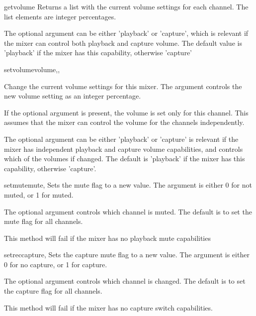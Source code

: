 \begin{methoddesc}[Mixer]{getvolume}{}
  Returns a list with the current volume settings for each channel.
  The list elements are integer percentages.

  The optional  argument can be either 'playback' or
  'capture', which is relevant if the mixer can control both playback
  and capture volume. The default value is 'playback' if the mixer has
  this capability, otherwise 'capture'

\end{methoddesc}

\begin{methoddesc}[Mixer]{setvolume}{volume,,
    }

  Change the current volume settings for this mixer. The 
  argument controls the new volume setting as an integer percentage.

  If the optional argument  is present, the volume is set
  only for this channel. This assumes that the mixer can control the
  volume for the channels independently.

  The optional  argument can be either 'playback' or
  'capture' is relevant if the mixer has independent playback and
  capture volume capabilities, and controls which of the volumes if
  changed. The default is 'playback' if the mixer has this capability,
  otherwise 'capture'.
\end{methoddesc}

\begin{methoddesc}[Mixer]{setmute}{mute, }
  Sets the mute flag to a new value. The  argument is either
  0 for not muted, or 1 for muted.

  The optional  argument controls which channel is muted.
  The default is to set the mute flag for all channels.

  This method will fail if the mixer has no playback mute capabilities
\end{methoddesc}

\begin{methoddesc}[Mixer]{setrec}{capture,}
  Sets the capture mute flag to a new value. The 
  argument is either 0 for no capture, or 1 for capture.

  The optional  argument controls which channel is
  changed. The default is to set the capture flag for all channels.

  This method will fail if the mixer has no capture switch
  capabilities.
\end{methoddesc}


